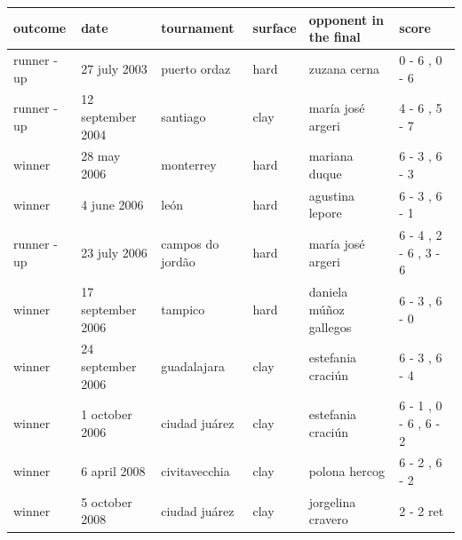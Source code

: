 \documentclass{article}
\begin{document}
\begin{tabular}{llllll}
\toprule
outcome & date & tournament & surface & opponent in the final & score \\
\midrule
runner - up & 27 july 2003 & puerto ordaz & hard & zuzana cerna & 0 - 6 , 0 - 6 \\
runner - up & 12 september 2004 & santiago & clay & maría josé argeri & 4 - 6 , 5 - 7 \\
winner & 28 may 2006 & monterrey & hard & mariana duque & 6 - 3 , 6 - 3 \\
winner & 4 june 2006 & león & hard & agustina lepore & 6 - 3 , 6 - 1 \\
runner - up & 23 july 2006 & campos do jordão & hard & maría josé argeri & 6 - 4 , 2 - 6 , 3 - 6 \\
winner & 17 september 2006 & tampico & hard & daniela múñoz gallegos & 6 - 3 , 6 - 0 \\
winner & 24 september 2006 & guadalajara & clay & estefania craciún & 6 - 3 , 6 - 4 \\
winner & 1 october 2006 & ciudad juárez & clay & estefania craciún & 6 - 1 , 0 - 6 , 6 - 2 \\
winner & 6 april 2008 & civitavecchia & clay & polona hercog & 6 - 2 , 6 - 2 \\
winner & 5 october 2008 & ciudad juárez & clay & jorgelina cravero & 2 - 2 ret \\
\bottomrule
\end{tabular}
\end{document}
